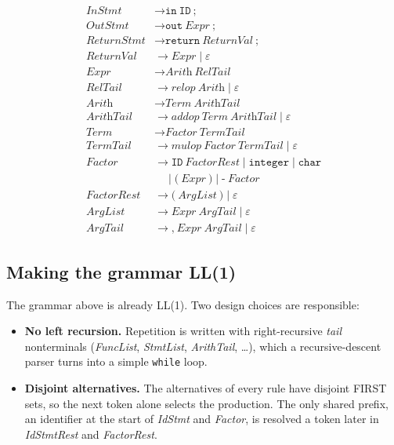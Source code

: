 \documentclass[11pt]{article}
\begin{document}
\begin{align*}
\textit{InStmt}     &\to \texttt{in}\ \texttt{ID}\ \texttt{;}\\
\textit{OutStmt}    &\to \texttt{out}\ \textit{Expr}\ \texttt{;}\\
\textit{ReturnStmt} &\to \texttt{return}\ \textit{ReturnVal}\ \texttt{;}\\
\textit{ReturnVal}  &\to \textit{Expr} \mid \varepsilon\\
\textit{Expr}       &\to \textit{Arith}\ \textit{RelTail}\\
\textit{RelTail}    &\to \textit{relop}\ \textit{Arith} \mid \varepsilon\\
\textit{Arith}      &\to \textit{Term}\ \textit{ArithTail}\\
\textit{ArithTail}  &\to \textit{addop}\ \textit{Term}\ \textit{ArithTail} \mid \varepsilon\\
\textit{Term}       &\to \textit{Factor}\ \textit{TermTail}\\
\textit{TermTail}   &\to \textit{mulop}\ \textit{Factor}\ \textit{TermTail} \mid \varepsilon\\
\textit{Factor}     &\to \texttt{ID}\ \textit{FactorRest} \mid \texttt{integer} \mid \texttt{char}\\
                    &\quad\mid \texttt{(}\ \textit{Expr}\ \texttt{)} \mid \texttt{-}\ \textit{Factor}\\
\textit{FactorRest} &\to \texttt{(}\ \textit{ArgList}\ \texttt{)} \mid \varepsilon\\
\textit{ArgList}    &\to \textit{Expr}\ \textit{ArgTail} \mid \varepsilon\\
\textit{ArgTail}    &\to \texttt{,}\ \textit{Expr}\ \textit{ArgTail} \mid \varepsilon
\end{align*}

\subsection{Making the grammar LL(1)}
The grammar above is already LL(1). Two design choices are responsible:

\begin{itemize}
  \item \textbf{No left recursion.} Repetition is written with right-recursive
        \emph{tail} nonterminals (\textit{FuncList}, \textit{StmtList},
        \textit{ArithTail}, \ldots), which a recursive-descent parser turns
        into a simple \texttt{while} loop.
  \item \textbf{Disjoint alternatives.} The alternatives of every rule have
        disjoint FIRST sets, so the next token alone selects the production.
        The only shared prefix, an identifier at the start of
        \textit{IdStmt} and \textit{Factor}, is resolved a token later in
        \textit{IdStmtRest} and \textit{FactorRest}.
\end{itemize}
\end{document}
